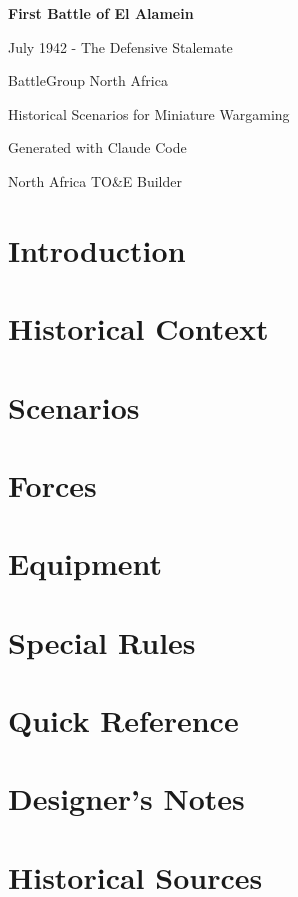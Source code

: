 \documentclass[11pt,letterpaper,twoside]{book}
\begin{document}
\begin{titlepage}
    \centering
    \vspace*{2cm}
    {\Huge\bfseries First Battle of El Alamein\par}
    \vspace{1cm}
    {\Large July 1942 - The Defensive Stalemate\par}
    \vspace{2cm}
    {\Large BattleGroup North Africa\par}
    {\large Historical Scenarios for Miniature Wargaming\par}
    \vfill
    {\large Generated with Claude Code\par}
    {\large North Africa TO&E Builder\par}
    \vspace{1cm}
\end{titlepage}

\tableofcontents


\chapter{Introduction}

\chapter{Historical Context}

\chapter{Scenarios}

\chapter{Forces}

\chapter{Equipment}

\chapter{Special Rules}

\appendix
\chapter{Quick Reference}

\chapter{Designer's Notes}

\chapter{Historical Sources}
\end{document}
